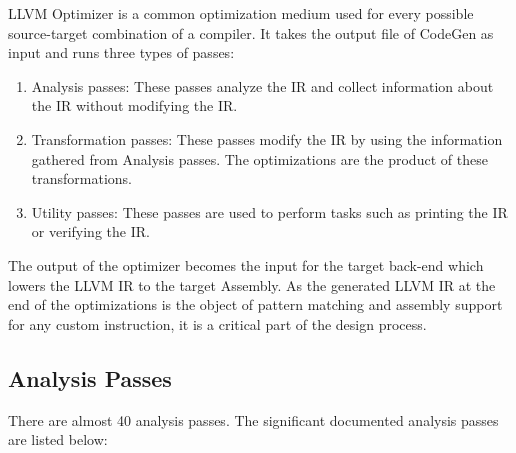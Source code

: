 LLVM Optimizer is a common optimization medium used for every possible source-target combination of a compiler. It takes the output file of CodeGen as input and runs three types of passes:

\begin{enumerate}
    \item Analysis passes: These passes analyze the IR and collect information about the IR without modifying the IR. 
    \item Transformation passes: These passes modify the IR by using the information gathered from Analysis passes. The optimizations are the product of these transformations. 
    \item Utility passes: These passes are used to perform tasks such as printing the IR or verifying the IR. 
\end{enumerate}

The output of the optimizer becomes the input for the target back-end which lowers the LLVM IR to the target Assembly. As the generated LLVM IR at the end of the optimizations is the object of pattern matching and assembly support for any custom instruction, it is a critical part of the design process.

\subsection{Analysis Passes}
There are almost 40 analysis passes. The significant documented analysis passes are listed below:

